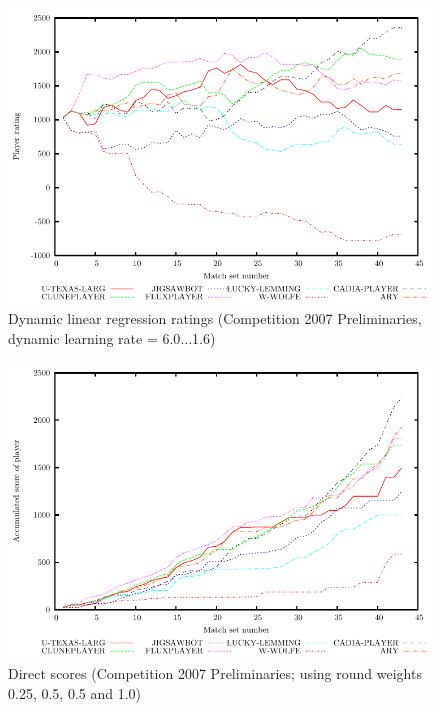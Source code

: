 \documentclass[a4paper,10pt]{article}
\begin{document}
\begin{figure}
 \centering
 \includegraphics[width=\textwidth]{dynamic_linear_regression_60}
 \caption{Dynamic linear regression ratings (Competition 2007 Preliminaries, dynamic learning rate = 6.0$\dotsc$1.6)}
 \label{fig:dynamic_linear_regression}
\end{figure}

\begin{figure}
 \centering
 \includegraphics[width=\textwidth]{direct_scores}
 \caption{Direct scores (Competition 2007 Preliminaries; using round weights 0.25, 0.5, 0.5 and 1.0)}
 \label{fig:direct_scores}
\end{figure}
\end{document}
